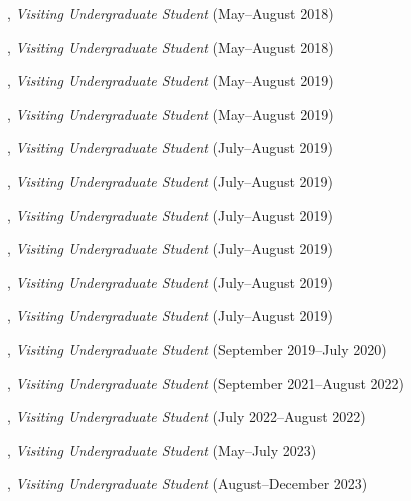 \documentclass[10pt]{article}
\newenvironment{myindentpar}[1]%
{\begin{list}{}%
         {\setlength{\leftmargin}{#1}}%
         \item[]%
}
{\end{list}}
\newcounter{list}
\begin{document}
\begin{myindentpar}{0.75cm}
\hspace{-0.75cm}{\bf Wenhao Yu}, \textit{Visiting Undergraduate Student} (May--August 2018)

\hspace{-0.75cm}{\bf Yu Shu}, \textit{Visiting Undergraduate Student} (May--August 2018)

\hspace{-0.75cm}{\bf Chuchen Deng}, \textit{Visiting Undergraduate Student} (May--August 2019)

\hspace{-0.75cm}{\bf Yihong Ma}, \textit{Visiting Undergraduate Student} (May--August 2019)

\hspace{-0.75cm}{\bf Xin Liu}, \textit{Visiting Undergraduate Student} (July--August 2019)

\hspace{-0.75cm}{\bf Wei Peng}, \textit{Visiting Undergraduate Student} (July--August 2019)

\hspace{-0.75cm}{\bf Mengxia Yu}, \textit{Visiting Undergraduate Student} (July--August 2019)

\hspace{-0.75cm}{\bf Kaifeng Yu}, \textit{Visiting Undergraduate Student} (July--August 2019)

\hspace{-0.75cm}{\bf Zhihan Zhang}, \textit{Visiting Undergraduate Student} (July--August 2019)

\hspace{-0.75cm}{\bf Yang Zhou}, \textit{Visiting Undergraduate Student} (July--August 2019)

\hspace{-0.75cm}{\bf Zaitang Li}, \textit{Visiting Undergraduate Student} (September 2019--July 2020)

\hspace{-0.75cm}{\bf Yunxiang Yan}, \textit{Visiting Undergraduate Student} (September 2021--August 2022)

\hspace{-0.75cm}{\bf Qi Liu}, \textit{Visiting Undergraduate Student} (July 2022--August 2022)

\hspace{-0.75cm}{\bf Kairui Hu}, \textit{Visiting Undergraduate Student} (May--July 2023)

\hspace{-0.75cm}{\bf Yuxuan Kuang}, \textit{Visiting Undergraduate Student} (August--December 2023)


\end{myindentpar}
\end{document}
